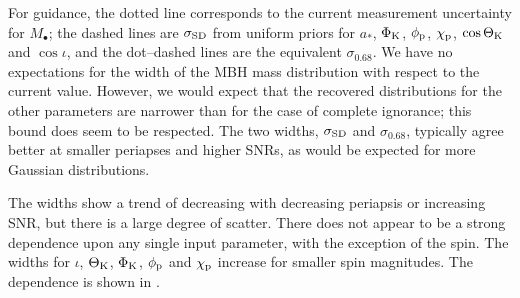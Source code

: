 For guidance, the dotted line corresponds to the current measurement uncertainty for $M_\bullet$; the dashed lines are $\sigma_\mathrm{SD}$ from uniform priors for $a_\ast$, $\Phi_\mathrm{K}$, $\phi_\mathrm{p}$, $\chi_\mathrm{p}$, $\cos\Theta_\mathrm{K}$ and $\cos\iota$, and the dot--dashed lines are the equivalent $\sigma_{0.68}$. We have no expectations for the width of the MBH mass distribution with respect to the current value. However, we would expect that the recovered distributions for the other parameters are narrower than for the case of complete ignorance; this bound does seem to be respected. The two widths, $\sigma_\mathrm{SD}$ and $\sigma_{0.68}$, typically agree better at smaller periapses and higher SNRs, as would be expected for more Gaussian distributions.

The widths show a trend of decreasing with decreasing periapsis or increasing SNR, but there is a large degree of scatter. There does not appear to be a strong dependence upon any single input parameter, with the exception of the spin. The widths for $\iota$, $\Theta_\mathrm{K}$, $\Phi_\mathrm{K}$, $\phi_\mathrm{p}$ and $\chi_\mathrm{p}$ increase for smaller spin magnitudes. The dependence is shown in .
